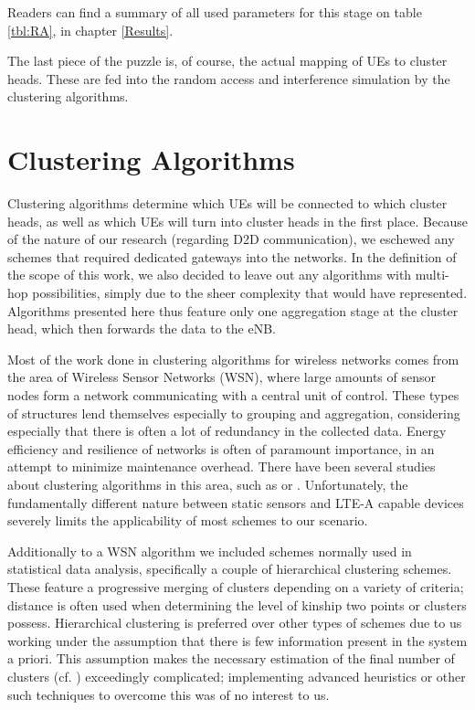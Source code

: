 Readers can find a summary of all used parameters for this stage on table \ref{tbl:RA}, in chapter \ref{Results}.

The last piece of the puzzle is, of course, the actual mapping of UEs to cluster heads. These are fed into the random access and interference simulation by the clustering algorithms.

\section{Clustering Algorithms} \label{ClusteringAlgs}
Clustering algorithms determine which UEs will be connected to which cluster heads, as well as which UEs will turn into cluster heads in the first place. Because of the nature of our research (regarding D2D communication), we eschewed any schemes that required dedicated gateways into the networks. In the definition of the scope of this work, we also decided to leave out any algorithms with multi-hop possibilities, simply due to the sheer complexity that would have represented. Algorithms presented here thus feature only one aggregation stage at the cluster head, which then forwards the data to the eNB.

Most of the work done in clustering algorithms for wireless networks comes from the area of Wireless Sensor Networks (WSN), where large amounts of sensor nodes form a network communicating with a central unit of control. These types of structures lend themselves especially to grouping and aggregation, considering especially that there is often a lot of redundancy in the collected data. Energy efficiency and resilience of networks is often of paramount importance, in an attempt to minimize maintenance overhead. There have been several studies about clustering algorithms in this area, such as \cite{Jiang2009} or \cite{Afsar2014}. Unfortunately, the fundamentally different nature between static sensors and LTE-A capable devices severely limits the applicability of most schemes to our scenario.

Additionally to a WSN algorithm we included schemes normally used in statistical data analysis, specifically a couple of hierarchical clustering schemes. These feature a progressive merging of clusters depending on a variety of criteria; distance is often used when determining the level of kinship two points or clusters possess. Hierarchical clustering is preferred over other types of schemes due to us working under the assumption that there is few information present in the system a priori. This assumption makes the necessary estimation of the final number of clusters (cf. \cite{Everitt2011}) exceedingly complicated; implementing advanced heuristics or other such techniques to overcome this was of no interest to us.

